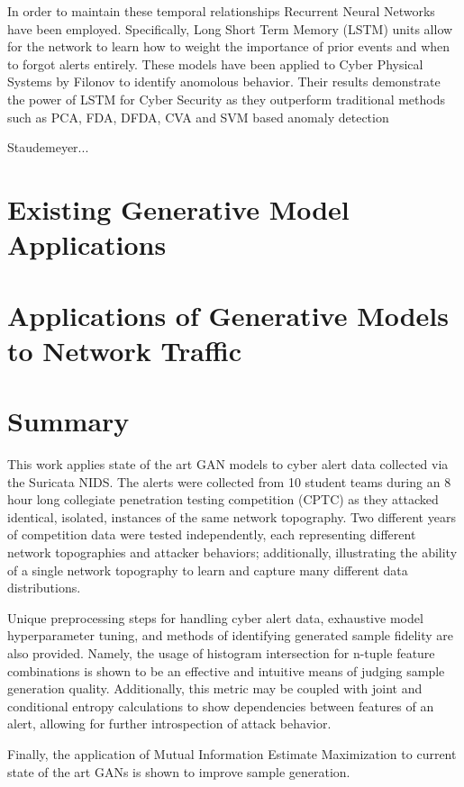 \documentclass[12pt,american]{report}
\begin{document}
In order to maintain these temporal relationships Recurrent Neural Networks have been employed. Specifically, Long Short Term Memory (LSTM) units allow for the network to learn how to weight the importance of prior events and when to forgot alerts entirely. These models have been applied to Cyber Physical Systems by Filonov \etal to identify anomolous behavior. Their results demonstrate the power of LSTM for Cyber Security as they outperform traditional methods such as PCA, FDA, DFDA, CVA and SVM based anomaly detection \cite{Filonov2016, Filonov2017}

Staudemeyer...


\section{Existing Generative Model Applications}

\section{Applications of Generative Models to Network Traffic}

\section{Summary}

This work applies state of the art GAN models to cyber alert data collected via the Suricata NIDS. The alerts were collected from 10 student teams during an 8 hour long collegiate penetration testing competition (CPTC) as they attacked identical, isolated, instances of the same network topography. Two different years of competition data were tested independently, each representing different network topographies and attacker behaviors; additionally, illustrating the ability of a single network topography to learn and capture many different data distributions. 

Unique preprocessing steps for handling cyber alert data, exhaustive model hyperparameter tuning, and methods of identifying generated sample fidelity are also provided. Namely, the usage of histogram intersection for n-tuple feature combinations is shown to be an effective and intuitive means of judging sample generation quality. Additionally, this metric may be coupled with joint and conditional entropy calculations to show dependencies between features of an alert, allowing for further introspection of attack behavior.

Finally, the application of Mutual Information Estimate Maximization to current state of the art GANs is shown to improve sample generation.
\end{document}
